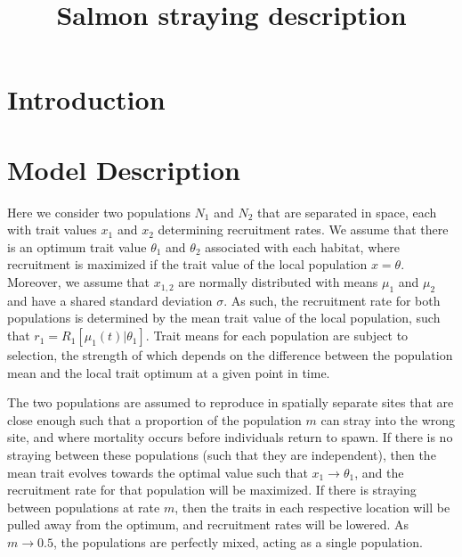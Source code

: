 \documentclass[onecolumn,preprintnumbers,amsmath,amssymb,superscriptaddress]{revtex4}
\begin{document}
\title{Salmon straying description}



\maketitle



\section*{Introduction}


\section*{Model Description}

Here we consider two populations $N_1$ and $N_2$ that are separated in space, each with trait values $x_1$ and $x_2$ determining recruitment rates.
We assume that there is an optimum trait value $\theta_1$ and $\theta_2$ associated with each habitat, where recruitment is maximized if the trait value of the local population $x = \theta$.
Moreover, we assume that $x_{1,2}$ are normally distributed with means $\mu_1$ and $\mu_2$ and have a shared standard deviation $\sigma$.
As such, the recruitment rate for both populations is determined by the mean trait value of the local population, such that $r_1 = R_1[\mu_1(t)|\theta_1]$.
Trait means for each population are subject to selection, the strength of which depends on the difference between the population mean and the local trait optimum at a given point in time.

The two populations are assumed to reproduce in spatially separate sites that are close enough such that a proportion of the population $m$ can stray into the wrong site, and where mortality occurs before individuals return to spawn.
If there is no straying between these populations (such that they are independent), then the mean trait evolves towards the optimal value such that $x_1 \rightarrow \theta_1$, and the recruitment rate for that population will be maximized.
If there is straying between populations at rate $m$, then the traits in each respective location will be pulled away from the optimum, and recruitment rates will be lowered.
As $m \rightarrow 0.5$, the populations are perfectly mixed, acting as a single population.
\end{document}
